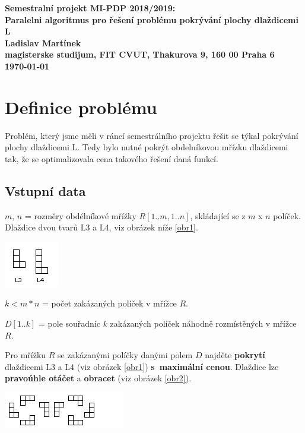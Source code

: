 \documentclass[epsf,epic,eepic,eepicemu]{article}
\begin{document}
\begin{center}
\bf Semestralní projekt MI-PDP 2018/2019:\\[5mm]
    Paralelni algoritmus pro řešení problému pokrývání plochy dlaždicemi L\\[5mm] 
       Ladislav Martínek\\[2mm]
magisterske studijum, FIT CVUT, Thakurova 9, 160 00 Praha 6\\[2mm]
\today
\end{center}

\section{Definice problému}

Problém, který jsme měli v ráncí semestrálního projektu řešit se týkal pokrývání plochy dlaždicemi L. Tedy bylo nutné pokrýt obdelníkovou mřízku dlaždicemi tak, že se optimalizovala cena takového řešení daná funkcí. 


\subsection{Vstupní data}
$m$, $n$ = rozměry obdélníkové mřížky $R[1..m,1..n]$, skládající se z $m$ x $n$ políček.
Dlaždice dvou tvarů L3 a L4, viz obrázek níže \ref{obr1}.

\begin{center}
 \includegraphics{ll.png}
 \label{obr1}
\end{center}

\noindent
$k <m*n $ = počet zakázaných políček v mřížce $R$.

\noindent
$D[1..k]$ = pole souřadnic $k$ zakázaných políček náhodně rozmístěných v mřížce $R$.

\noindent
Pro mřížku $R$ se zakázanými políčky danými polem $D$ najděte \textbf{pokrytí}  dlaždicemi L3 a L4 (viz obrázek \ref{obr1}) \textbf{s~maximální cenou}.
Dlaždice lze \textbf{pravoúhle otáčet} a \textbf{obracet} (viz obrázek \ref{obr2}).

\begin{center}
    \includegraphics{l2.png}
     \label{obr2}
    \end{center}
  
\end{document}

